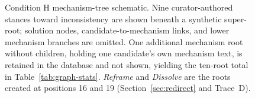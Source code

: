 \begin{figure}[H]
\centering
{}
\caption{Condition H mechanism-tree schematic. Nine curator-authored stances toward inconsistency are shown beneath a synthetic super-root; solution nodes, candidate-to-mechanism links, and lower mechanism branches are omitted. One additional mechanism root without children, holding one candidate's own mechanism text, is retained in the database and not shown, yielding the ten-root total in Table~\ref{tab:graph-stats}. \emph{Reframe} and \emph{Dissolve} are the roots created at positions 16 and 19 (Section~\ref{sec:redirect} and Trace~D).}
\label{fig:tree-h}
\end{figure}

